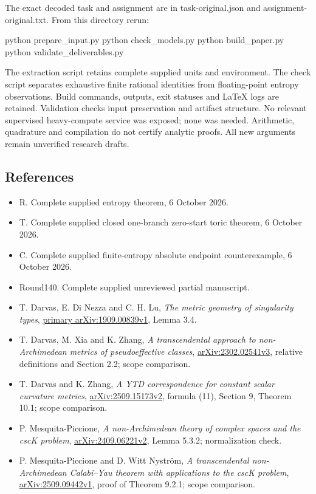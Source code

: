 \documentclass[
  11pt,
]{article}
\newenvironment{Shaded}{}{}
\newcommand{\NormalTok}[1]{#1}
\providecommand{\tightlist}{%
  \setlength{\itemsep}{0pt}\setlength{\parskip}{0pt}}
\begin{document}
The exact decoded task and assignment are in task-original.json and
assignment-original.txt. From this directory rerun:

\begin{Shaded}
\begin{Highlighting}[]
\NormalTok{python prepare\_input.py}
\NormalTok{python check\_models.py}
\NormalTok{python build\_paper.py}
\NormalTok{python validate\_deliverables.py}
\end{Highlighting}
\end{Shaded}

The extraction script retains complete supplied units and environment.
The check script separates exhaustive finite rational identities from
floating-point entropy observations. Build commands, outputs, exit
statuses and LaTeX logs are retained. Validation checks input
preservation and artifact structure. No relevant supervised
heavy-compute service was exposed; none was needed. Arithmetic,
quadrature and compilation do not certify analytic proofs. All new
arguments remain unverified research drafts.

\subsection{References}\label{references}

\begin{itemize}
\tightlist
\item
  R. Complete supplied entropy theorem, 6 October 2026.
\item
  T. Complete supplied closed one-branch zero-start toric theorem, 6
  October 2026.
\item
  C. Complete supplied finite-entropy absolute endpoint counterexample,
  6 October 2026.
\item
  Round140. Complete supplied unreviewed partial manuscript.
\item
  T. Darvas, E. Di Nezza and C. H. Lu, \emph{The metric geometry of
  singularity types}, \href{https://arxiv.org/pdf/1909.00839v1}{primary
  arXiv:1909.00839v1}, Lemma 3.4.
\item
  T. Darvas, M. Xia and K. Zhang, \emph{A transcendental approach to
  non-Archimedean metrics of pseudoeffective classes},
  \href{https://arxiv.org/pdf/2302.02541v3}{arXiv:2302.02541v3},
  relative definitions and Section 2.2; scope comparison.
\item
  T. Darvas and K. Zhang, \emph{A YTD correspondence for constant scalar
  curvature metrics},
  \href{https://arxiv.org/pdf/2509.15173v2}{arXiv:2509.15173v2}, formula
  (11), Section 9, Theorem 10.1; scope comparison.
\item
  P. Mesquita-Piccione, \emph{A non-Archimedean theory of complex spaces
  and the cscK problem},
  \href{https://arxiv.org/pdf/2409.06221v2}{arXiv:2409.06221v2}, Lemma
  5.3.2; normalization check.
\item
  P. Mesquita-Piccione and D. Witt Nyström, \emph{A transcendental
  non-Archimedean Calabi--Yau theorem with applications to the cscK
  problem},
  \href{https://arxiv.org/pdf/2509.09442v1}{arXiv:2509.09442v1}, proof
  of Theorem 9.2.1; scope comparison.
\end{itemize}
\end{document}
